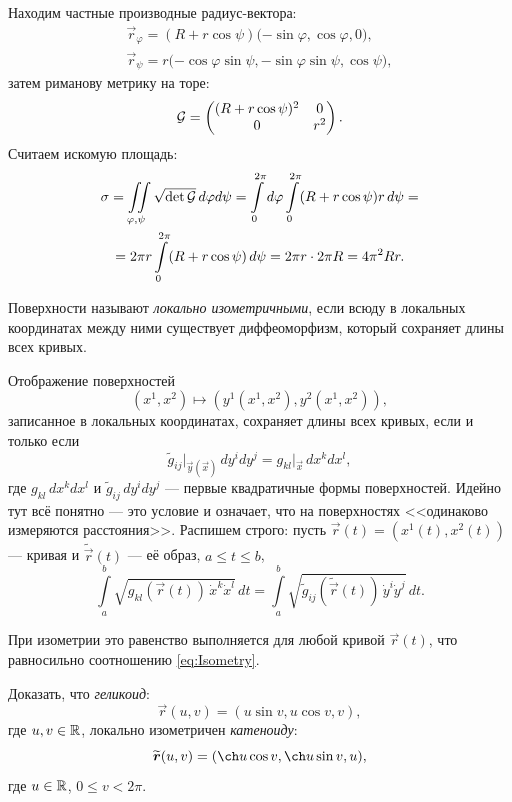 \begin{solution}
	Находим частные производные радиус-вектора:
	\begin{gather*}
		\vec{r}_\varphi = (R + r\cos\psi)\big({-\sin\varphi}, \cos\varphi, 0\big),\\
		\vec{r}_\psi = r\big({-\cos\varphi\sin\psi}, -\sin\varphi\sin\psi, \cos\psi\big),
	\end{gather*}
	затем риманову метрику на торе:
	\[
		\mathcal{G} =
		\begin{pmatrix}
			(R + r\cos\psi)^2 & 0\\
			0 & r^2
		\end{pmatrix}.
	\]
	Считаем искомую площадь:
	\begin{multline*}
		\sigma = \iint\limits_{\varphi, \psi}\sqrt{\det\mathcal{G}}\,d\varphi d\psi = \int\limits_0^{2\pi}d\varphi\int\limits_0^{2\pi}(R + r\cos\psi)r\,d\psi =\\ = 2\pi r\int\limits_0^{2\pi}(R + r\cos\psi)\,d\psi = 2\pi r \cdot 2\pi R = 4\pi^2 Rr.
	\end{multline*}
\end{solution}

\begin{definition}
	Поверхности называют \textit{локально изометричными}, если всюду в локальных координатах между ними существует диффеоморфизм, который сохраняет длины всех кривых.
\end{definition}

Отображение поверхностей
\[
	(x^1, x^2) \mapsto (y^1(x^1, x^2), y^2(x^1, x^2)),
\]
записанное в локальных координатах, сохраняет длины всех кривых, если и только если
\begin{equation} \label{eq:Isometry}
	\widetilde{g}_{ij}\big|_{\vec{y}(\vec{x})}\,dy^idy^j = g_{kl}\big|_{\vec{x}}\,dx^kdx^l,
\end{equation}
где $g_{kl}\,dx^kdx^l$ и $\widetilde{g}_{ij}\,dy^idy^j$ --- первые квадратичные формы поверхностей. Идейно тут всё понятно --- это условие и означает, что на поверхностях <<одинаково измеряются расстояния>>. Распишем строго: пусть $\vec{r}(t) = (x^1(t), x^2(t))$ --- кривая и $\widetilde{\vec{r}}(t)$ --- её образ, $a \leqslant t \leqslant b$,
\[
	\int\limits_a^b\sqrt{g_{kl}(\vec{r}(t))\,\dot{x}^k\dot{x}^l}\,dt = \int\limits_a^b\sqrt{\widetilde{g}_{ij}(\widetilde{\vec{r}}(t))\,\dot{y}^i\dot{y}^j}\,dt.
\]

При изометрии это равенство выполняется для любой кривой $\vec{r}(t)$, что равносильно соотношению \eqref{eq:Isometry}.

\begin{problem}
	Доказать, что \textit{геликоид}:
	\[
		\vec{r}(u, v) = (u\sin v, u\cos v, v),
	\]
	где $u, v \in \mathbb{R}$, локально изометричен \textit{катеноиду}:
	\[
		\widetilde{\vec{r}}(u, v) = (\ch u\cos v, \ch u\sin v, u),
	\]
	где $u \in \mathbb{R}$, $0 \leqslant v < 2\pi$.
\end{problem}


